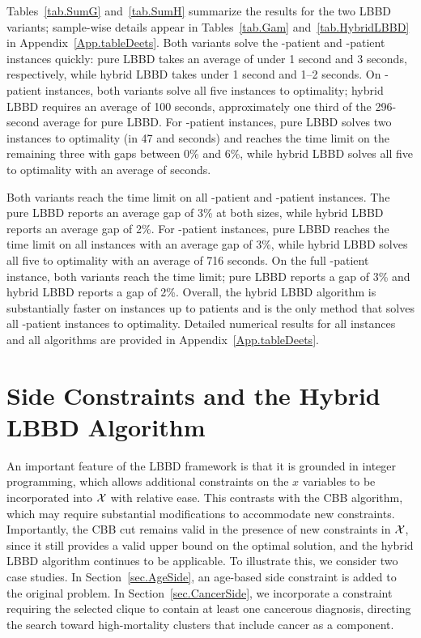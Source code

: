 Tables~\ref{tab.SumG} and~\ref{tab.SumH} summarize the results for
the two LBBD variants; sample-wise details appear in
Tables~\ref{tab.Gam} and~\ref{tab.HybridLBBD} in
Appendix~\ref{App.tableDeets}. Both variants solve the
-patient and -patient instances quickly:
pure LBBD takes an average of under 1 second and 3 seconds,
respectively, while hybrid LBBD takes under 1 second and 1--2
seconds. On -patient instances, both variants solve
all five instances to optimality; hybrid LBBD requires an average of
100 seconds, approximately one third of the 296-second average for
pure LBBD. For -patient instances, pure LBBD solves
two instances to optimality (in 47 and  seconds) and
reaches the time limit on the remaining three with gaps between
0\% and 6\%, while hybrid LBBD solves all five to optimality with an
average of  seconds.

Both variants reach the time limit on all -patient and
-patient instances. The pure LBBD reports an average
gap of 3\% at both sizes,
while hybrid LBBD reports an average gap of 2\%. For -patient instances, pure LBBD reaches
the time limit on all instances with an average gap of 3\%, while hybrid LBBD solves all five to optimality with an
average of 716 seconds. On the
full -patient instance, both variants reach the time
limit; pure LBBD reports a gap of 3\% and hybrid LBBD reports a gap
of 2\%. Overall, the hybrid LBBD algorithm is substantially faster on
instances up to  patients and is the only method that
solves all -patient instances to optimality. Detailed numerical results for all instances and all algorithms are
provided in Appendix~\ref{App.tableDeets}.

\section{Side Constraints and the Hybrid LBBD
Algorithm}\label{sec.sidecons}
An important feature of the LBBD framework is that it is grounded in
integer programming, which allows additional constraints on the $x$
variables to be incorporated into $\mathcal{X}$ with relative ease. This
contrasts with the CBB algorithm, which may require substantial
modifications to accommodate new constraints. Importantly, the CBB
cut remains valid in the presence of new constraints in $\mathcal{X}$,
since it still provides a valid upper bound on the optimal solution,
and the hybrid LBBD algorithm continues to be applicable. To
illustrate this, we consider two case studies. In Section~\ref{sec.AgeSide}, an age-based side
constraint is added to the original problem. In Section~\ref{sec.CancerSide}, we incorporate a constraint
requiring the selected clique to contain at least one cancerous
diagnosis, directing the search toward high-mortality clusters
that include cancer as a component.

